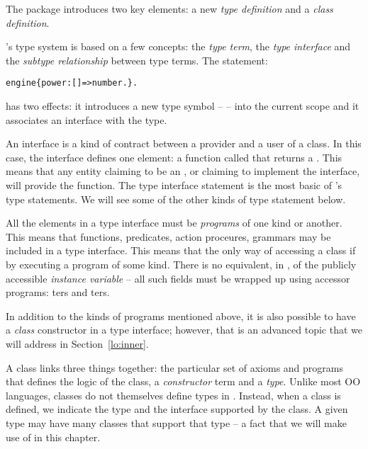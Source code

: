 \noindent
The  package introduces two key elements: a new \emph{type definition} and a \emph{class definition}.

\go's type system is based on a few concepts: the \emph{type term}, the \emph{type interface} and the \emph{subtype relationship} between type terms. The statement:
\begin{alltt}
engine \impl{} \{ power:[]=>number. \}.
\end{alltt}
has two effects: it introduces a new type symbol --  -- into the current scope and it associates an interface with the  type.

An interface is a kind of contract between a provider and a user of a class. In this case, the  interface defines one element: a function called  that returns a . This means that any entity claiming to be an , or claiming to implement the  interface, will provide the  function. The type interface statement is the most basic of \go's type statements. We will see some of the other kinds of type statement below.

\begin{aside}
All the elements in a type interface must be \emph{programs} of one kind or another. This means that functions, predicates, action proceures, grammars may be included in a type interface.
This means that the only way of accessing a class if by executing a program of some kind. There is no equivalent, in \go, of the publicly accessible \emph{instance variable} -- all such fields must be wrapped up using accessor programs: ters and ters.
\end{aside}
\begin{aside}
In addition to the kinds of programs mentioned above, it is also possible to have a \emph{class} constructor in a type interface; however, that is an advanced topic that we will address in Section~\vref{lo:inner}.
\end{aside}

\noindent
A \go class links three things together: the particular set of axioms and programs that defines the logic of the class, a \emph{constructor} term and a \emph{type}. Unlike most OO languages, classes do not themselves define types in \go. Instead, when a class is defined, we indicate the type and the interface supported by the class. A given type may have many classes that support that type -- a fact that we will make use of in this chapter.

